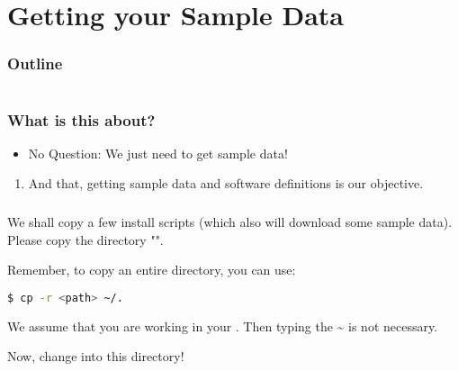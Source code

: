 \section{Getting your Sample Data}

\begin{frame}
	\frametitle{Outline}
	\begin{columns}[t]
		\begin{column}{.5\textwidth}
			\tableofcontents[sections={1-9},currentsection]
		\end{column}
		\begin{column}{.5\textwidth}
			\tableofcontents[sections={10-18},currentsection]
		\end{column}
	\end{columns}
\end{frame}

\begin{frame}
	\frametitle{What is this about?}
	\begin{question}[Questions]\begin{itemize}
			\item No Question: We just need to get sample data!
		\end{itemize}
	\end{question}
	\begin{docs}[Objectives]
		\begin{enumerate}
			\item And that, getting sample data and software definitions is our objective.
		\end{enumerate}
	\end{docs}
\end{frame}

\begin{frame}[fragile]
  \frametitle{}
  We shall copy a few install scripts (which also will download some sample data).\newline
  Please copy the directory "\texttt{}".\newline
  \begin{hint}
  	Remember, to copy an entire directory, you can use:
  	\begin{lstlisting}[language=Bash, style=Shell]
$ cp -r <path> ~/.
  	\end{lstlisting}
    We assume that you are working in your . Then typing the \textasciitilde{} is not necessary.
  \end{hint}
  \pause
  Now, change into this directory!  
\end{frame}

